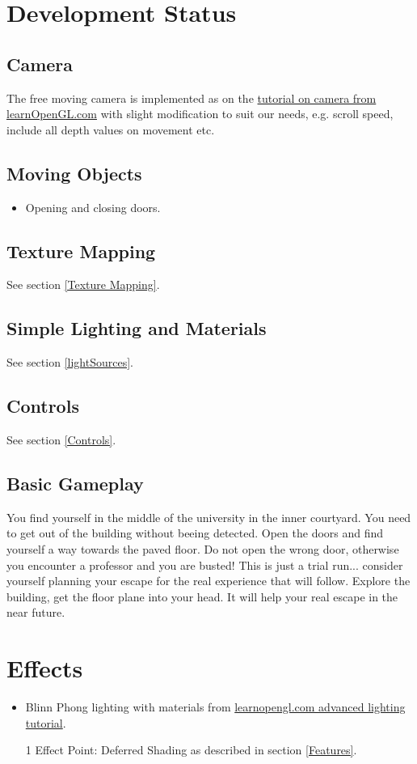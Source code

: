 \documentclass[12pt]{article}
\begin{document}
\section{Development Status}
\subsection{Camera}
The free moving camera is implemented as on the \href{http://www.learnopengl.com/#!Getting-started/Camera}{tutorial on camera from learnOpenGL.com} with slight modification to suit our needs, e.g. scroll speed, include all depth values on movement etc.

\subsection{Moving Objects}
\begin{itemize}
\item Opening and closing doors.
\end{itemize}

\subsection{Texture Mapping}
See section \ref{Texture Mapping}.
\subsection{Simple Lighting and Materials}
See section \ref{lightSources}.
\subsection{Controls}
See section \ref{Controls}.
\subsection{Basic Gameplay}
You find yourself in the middle of the university in the inner courtyard. You need to get out of the building without beeing detected. Open the doors and find yourself a way towards the paved floor. Do not open the wrong door, otherwise you encounter a professor and you are busted!
This is just a trial run... consider yourself planning your escape for the real experience that will follow. Explore the building, get the floor plane into your head. It will help your real escape in the near future.


\section{Effects}
\begin{itemize}
	\item Blinn Phong lighting with materials from \href{http://learnopengl.com/#!Advanced-Lighting/Advanced-Lighting}{learnopengl.com advanced lighting tutorial}.
	\item [1] Effect Point: Deferred Shading as described in section \ref{Features}.
\end{itemize}
\end{document}
